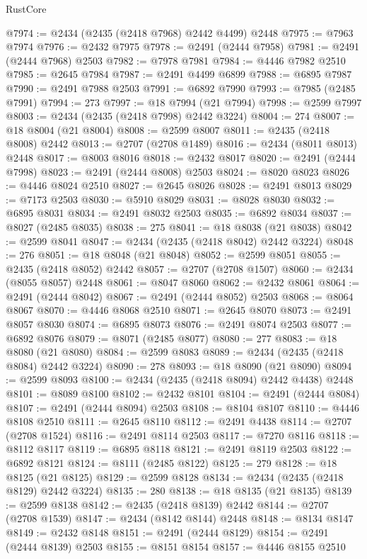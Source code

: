\begin{lexlean}{RustCore}
\begin{coremodule}
@7974 := @2434 (@2435 (@2418 @7968) @2442 @4499) @2448
@7975 := @7963 @7974
@7976 := @2432 @7975
@7978 := @2491 (@2444 @7958)
@7981 := @2491 (@2444 @7968) @2503
@7982 := @7978 @7981
@7984 := @4446 @7982 @2510
@7985 := @2645 @7984
@7987 := @2491 @4499 @6899
@7988 := @6895 @7987
@7990 := @2491 @7988 @2503
@7991 := @6892 @7990
@7993 := @7985 (@2485 @7991)
@7994 := 273
@7997 := @18 @7994 (@21 @7994)
@7998 := @2599 @7997
@8003 := @2434 (@2435 (@2418 @7998) @2442 @3224)
@8004 := 274
@8007 := @18 @8004 (@21 @8004)
@8008 := @2599 @8007
@8011 := @2435 (@2418 @8008) @2442
@8013 := @2707 (@2708 @1489)
@8016 := @2434 (@8011 @8013) @2448
@8017 := @8003 @8016
@8018 := @2432 @8017
@8020 := @2491 (@2444 @7998)
@8023 := @2491 (@2444 @8008) @2503
@8024 := @8020 @8023
@8026 := @4446 @8024 @2510
@8027 := @2645 @8026
@8028 := @2491 @8013
@8029 := @7173 @2503
@8030 := @5910 @8029
@8031 := @8028 @8030
@8032 := @6895 @8031
@8034 := @2491 @8032 @2503
@8035 := @6892 @8034
@8037 := @8027 (@2485 @8035)
@8038 := 275
@8041 := @18 @8038 (@21 @8038)
@8042 := @2599 @8041
@8047 := @2434 (@2435 (@2418 @8042) @2442 @3224)
@8048 := 276
@8051 := @18 @8048 (@21 @8048)
@8052 := @2599 @8051
@8055 := @2435 (@2418 @8052) @2442
@8057 := @2707 (@2708 @1507)
@8060 := @2434 (@8055 @8057) @2448
@8061 := @8047 @8060
@8062 := @2432 @8061
@8064 := @2491 (@2444 @8042)
@8067 := @2491 (@2444 @8052) @2503
@8068 := @8064 @8067
@8070 := @4446 @8068 @2510
@8071 := @2645 @8070
@8073 := @2491 @8057 @8030
@8074 := @6895 @8073
@8076 := @2491 @8074 @2503
@8077 := @6892 @8076
@8079 := @8071 (@2485 @8077)
@8080 := 277
@8083 := @18 @8080 (@21 @8080)
@8084 := @2599 @8083
@8089 := @2434 (@2435 (@2418 @8084) @2442 @3224)
@8090 := 278
@8093 := @18 @8090 (@21 @8090)
@8094 := @2599 @8093
@8100 := @2434 (@2435 (@2418 @8094) @2442 @4438) @2448
@8101 := @8089 @8100
@8102 := @2432 @8101
@8104 := @2491 (@2444 @8084)
@8107 := @2491 (@2444 @8094) @2503
@8108 := @8104 @8107
@8110 := @4446 @8108 @2510
@8111 := @2645 @8110
@8112 := @2491 @4438
@8114 := @2707 (@2708 @1524)
@8116 := @2491 @8114 @2503
@8117 := @7270 @8116
@8118 := @8112 @8117
@8119 := @6895 @8118
@8121 := @2491 @8119 @2503
@8122 := @6892 @8121
@8124 := @8111 (@2485 @8122)
@8125 := 279
@8128 := @18 @8125 (@21 @8125)
@8129 := @2599 @8128
@8134 := @2434 (@2435 (@2418 @8129) @2442 @3224)
@8135 := 280
@8138 := @18 @8135 (@21 @8135)
@8139 := @2599 @8138
@8142 := @2435 (@2418 @8139) @2442
@8144 := @2707 (@2708 @1539)
@8147 := @2434 (@8142 @8144) @2448
@8148 := @8134 @8147
@8149 := @2432 @8148
@8151 := @2491 (@2444 @8129)
@8154 := @2491 (@2444 @8139) @2503
@8155 := @8151 @8154
@8157 := @4446 @8155 @2510

\end{coremodule}
\end{lexlean}
